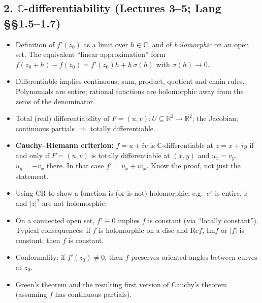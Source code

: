 \documentclass[12pt, reqno]{amsart}
\theoremstyle{definition}
\numberwithin{equation}{subsection}
\newcommand{\C}{\mathbb{C}}
\newcommand{\R}{\mathbb{R}}
\newcommand{\ov}[1]{\overline{#1}}
\renewcommand{\Re}{\mathrm{Re}}
\renewcommand{\Im}{\mathrm{Im}}
\begin{document}
\subsection*{2. $\C$-differentiability \normalfont (Lectures 3--5; Lang \S\S1.5--1.7)}
\begin{itemize}[leftmargin=*]
\item Definition of $f'(z_0)$ as a limit over $h\in\C$, and of \emph{holomorphic} on an open set.
      The equivalent ``linear approximation'' form $f(z_0+h)-f(z_0)=f'(z_0)h+h\,\sigma(h)$ with $\sigma(h)\to0$.
\item Differentiable implies continuous; sum, product, quotient and chain rules.
      Polynomials are entire; rational functions are holomorphic away from the zeros of the denominator.
\item Total (real) differentiability of $F=(u,v):U\subseteq\R^2\to\R^2$; the Jacobian;
      continuous partials $\Rightarrow$ totally differentiable.
\item \textbf{Cauchy--Riemann criterion:} $f=u+iv$ is $\C$-differentiable at $z=x+iy$ if and only if
      $F=(u,v)$ is totally differentiable at $(x,y)$ and $u_x=v_y$, $u_y=-v_x$ there.
      In that case $f'=u_x+iv_x$. Know the proof, not just the statement.
\item Using CR to show a function is (or is not) holomorphic; e.g.\ $e^z$ is entire, $\ov z$ and $|z|^2$ are not holomorphic.
\item On a connected open set, $f'\equiv0$ implies $f$ is constant (via ``locally constant'').
      Typical consequences: if $f$ is holomorphic on a disc and $\Re f$, $\Im f$ or $|f|$ is constant, then $f$ is constant.
\item Conformality: if $f'(z_0)\ne0$, then $f$ preserves oriented angles between curves at $z_0$.
\item Green's theorem and the resulting first version of Cauchy's theorem
      (assuming $f$ has continuous partials).
\end{itemize}
\end{document}
